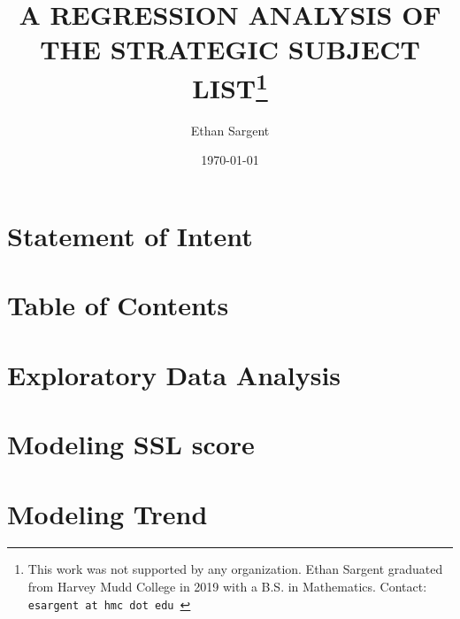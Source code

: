 \documentclass{article}
\title{A REGRESSION ANALYSIS OF THE STRATEGIC SUBJECT LIST\thanks{This work was not supported by any organization. Ethan Sargent graduated from Harvey Mudd College in 2019 with a B.S. in Mathematics. Contact: {\tt esargent at hmc dot edu }}}
\author{Ethan Sargent}
\date{\today}
\begin{document}
\maketitle
\newpage
 

\section{Statement of Intent}


\newpage

\section{Table of Contents}
\tableofcontents
\newpage

\section{Exploratory Data Analysis}


\newpage

\section{Modeling SSL score}


\newpage


\section{Modeling Trend}


\newpage
\end{document}
